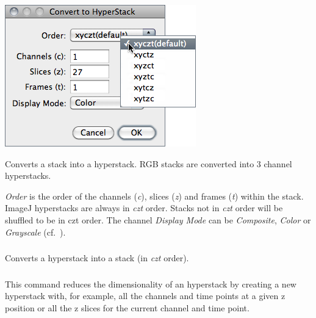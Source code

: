 \begin{minipage}[c][1\totalheight][t]{0.44\columnwidth}%
\includegraphics[scale=0.55]{images/StackToHyperstack}%
\end{minipage}%
\begin{minipage}[c][1\totalheight][t]{0.56\columnwidth}%
Converts a stack into a hyperstack. RGB stacks are converted into
3 channel hyperstacks. \medskip{}


\emph{Order} is the order of the channels (\emph{c}), slices (\emph{z})
and frames (\emph{t}) within the stack. ImageJ hyperstacks are always
in \emph{czt} order. Stacks not in \emph{czt} order will be shuffled
to be in czt order. The channel \emph{Display Mode} can be \emph{Composite},
\emph{Color} or \emph{Grayscale} (cf.\ ).


%
\end{minipage}


\subsubsection[\protect\userinterface{Hyperstack to Stack}]{\protect{}\label{sub:Hyperstack-to-Stack}
\improvement{}}

Converts a hyperstack into a stack (in \emph{czt} order).




\subsubsection{\protect{}\label{sub:Reduce-Dimensionality...}}

This command \cite{C-ReduceDimens} reduces
the dimensionality of an hyperstack by creating a new hyperstack with,
for example, all the channels and time points at a given z position
or all the z slices for the current channel and time point.

